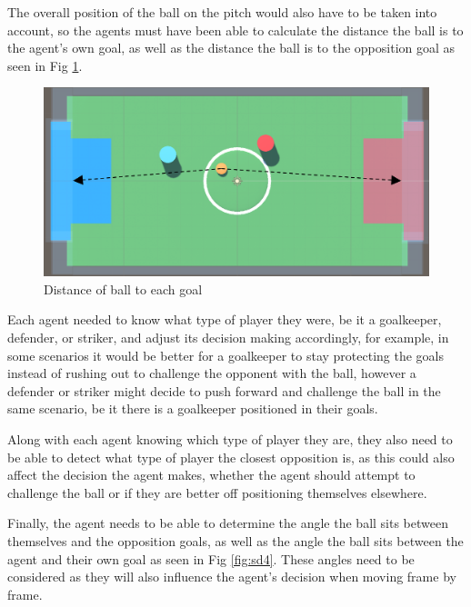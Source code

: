 \begin{flushleft}
The overall position of the ball on the pitch would also have to be taken into account, so the agents must have been able to calculate the distance the ball is to the agent's own goal, as well as the distance the ball is to the opposition goal as seen in Fig \ref{fig:sd3}. 
\end{flushleft}

\begin{figure}[h]
    \centering
    \includegraphics[width=115mm, height=55mm]{img/Image3.png}
    \caption{Distance of ball to each goal}
    \label{fig:sd3}
\end{figure}

\begin{flushleft}
Each agent needed to know what type of player they were, be it a goalkeeper, defender, or striker, and adjust its decision making accordingly, for example, in some scenarios it would be better for a goalkeeper to stay protecting the goals instead of rushing out to challenge the opponent with the ball, however a defender or striker might decide to push forward and challenge the ball in the same scenario, be it there is a goalkeeper positioned in their goals.

Along with each agent knowing which type of player they are, they also need to be able to detect what type of player the closest opposition is, as this could also affect the decision the agent makes, whether the agent should attempt to challenge the ball or if they are better off positioning themselves elsewhere.

Finally, the agent needs to be able to determine the angle the ball sits between themselves and the opposition goals, as well as the angle the ball sits between the agent and their own goal as seen in Fig \ref{fig:sd4}. These angles need to be considered as they will also influence the agent’s decision when moving frame by frame.
\end{flushleft}

